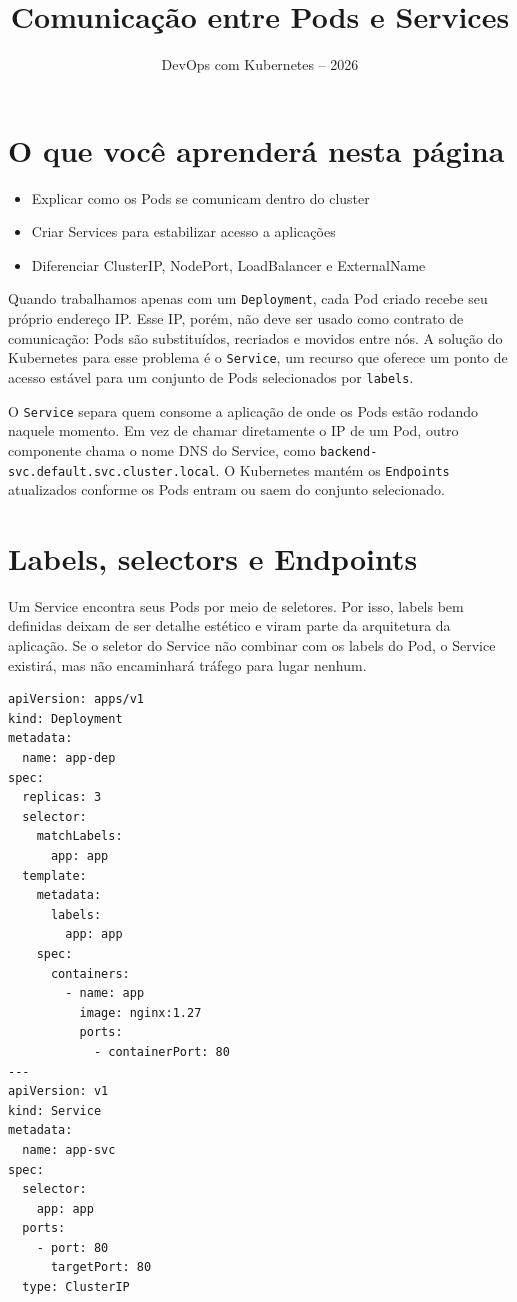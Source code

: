 \documentclass[11pt,a4paper]{article}
\title{\color{secondary}\Huge\textbf{Comunicação entre Pods e Services}}
\author{\color{primary}DevOps com Kubernetes -- 2026}
\date{}
\begin{document}
\maketitle


\section*{\color{primary}O que você aprenderá nesta página}
\begin{itemize}
\item Explicar como os Pods se comunicam dentro do cluster
\item Criar Services para estabilizar acesso a aplicações
\item Diferenciar ClusterIP, NodePort, LoadBalancer e ExternalName
\end{itemize}

Quando trabalhamos apenas com um \texttt{Deployment}, cada Pod criado recebe seu próprio endereço IP. Esse IP, porém, não deve ser usado como contrato de comunicação: Pods são substituídos, recriados e movidos entre nós. A solução do Kubernetes para esse problema é o \texttt{Service}, um recurso que oferece um ponto de acesso estável para um conjunto de Pods selecionados por \texttt{labels}.

O \texttt{Service} separa quem consome a aplicação de onde os Pods estão rodando naquele momento. Em vez de chamar diretamente o IP de um Pod, outro componente chama o nome DNS do Service, como \texttt{backend-svc.default.svc.cluster.local}. O Kubernetes mantém os \texttt{Endpoints} atualizados conforme os Pods entram ou saem do conjunto selecionado.

\section*{\color{primary}Labels, selectors e Endpoints}

Um Service encontra seus Pods por meio de seletores. Por isso, labels bem definidas deixam de ser detalhe estético e viram parte da arquitetura da aplicação. Se o seletor do Service não combinar com os labels do Pod, o Service existirá, mas não encaminhará tráfego para lugar nenhum.

\begin{lstlisting}[language=bash]
apiVersion: apps/v1
kind: Deployment
metadata:
  name: app-dep
spec:
  replicas: 3
  selector:
    matchLabels:
      app: app
  template:
    metadata:
      labels:
        app: app
    spec:
      containers:
        - name: app
          image: nginx:1.27
          ports:
            - containerPort: 80
---
apiVersion: v1
kind: Service
metadata:
  name: app-svc
spec:
  selector:
    app: app
  ports:
    - port: 80
      targetPort: 80
  type: ClusterIP
\end{lstlisting}
\end{document}
